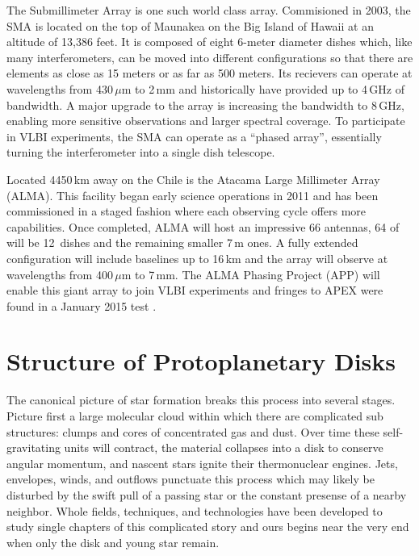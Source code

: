 The Submillimeter Array \citep[SMA][]{ho04} is one such world class array.  Commisioned in 2003, the SMA is located on the top of 
Maunakea on the Big Island of Hawaii at an altitude of 13,386 feet.
It is composed of eight 6-meter diameter dishes which, like many 
interferometers, can be moved into different configurations so that there are elements as close as 
15 meters or as far as 500 meters.  Its recievers can operate at wavelengths from 430\,$\mu$m to 2\,mm and 
historically have provided up to 4\,GHz of bandwidth.  A major upgrade to the array is increasing the bandwidth
to 8\,GHz, enabling more sensitive observations and larger spectral coverage.  To participate in VLBI 
experiments, the SMA can operate as a ``phased array'', essentially turning the interferometer into a single 
dish telescope.

Located 4450\,km away on the Chile is the Atacama Large Millimeter Array (ALMA).  This facility began early
science operations in 2011 and has been commissioned in a staged fashion where each observing cycle offers more 
capabilities.  Once completed, ALMA will host an impressive 66 antennas, 64 of will be 12\, dishes and
the remaining smaller 7\,m ones.  A fully extended configuration will include baselines up to 16\,km and the 
array will observe at wavelengths from 400\,$\mu$m to 7\,mm.  The ALMA Phasing Project (APP) will enable this
giant array to join VLBI experiments and fringes to APEX were found in a January 2015 test \citep{matthews15}.


\section{Structure of Protoplanetary Disks}

The canonical picture of star formation breaks this process into several stages.  Picture first a large 
molecular cloud within which there are complicated sub structures: clumps and cores of 
concentrated gas and dust.  Over time these self-gravitating units will contract,  the material collapses into 
a disk to conserve angular momentum, and nascent stars ignite their thermonuclear engines.  Jets, envelopes, 
winds, and outflows punctuate this 
process which may likely be disturbed by the swift pull of a passing star or the constant presense of a nearby 
neighbor.  Whole fields, techniques, and technologies have been developed to study single chapters of this 
complicated story and ours begins near the very end when only the disk and young star remain.

